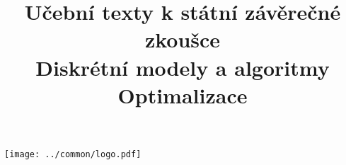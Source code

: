\clearpage

\clearpage

\title{\LARGE Učební texty k státní závěrečné zkoušce \\ Diskrétní modely a algoritmy \\ Optimalizace}




\maketitle

\vspace{10mm}
\begin{center}
\texttt{[image: ../common/logo.pdf]}
\end{center} 

\clearpage

\clearpage

\tableofcontents








